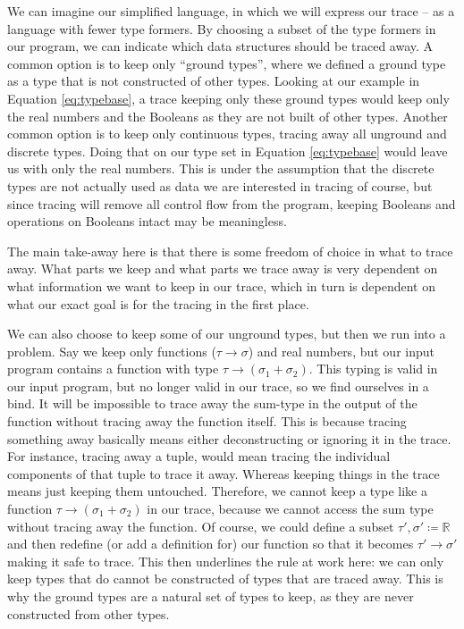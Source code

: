     We can imagine our simplified language, in which we will express our trace -- as a language with fewer type formers.
    By choosing a subset of the type formers in our program, we can indicate which data structures should be traced away.
    A common option is to keep only ``ground types'', where we defined a ground type as a type that is not constructed of other types.
    Looking at our example in Equation \ref{eq:typebase}, a trace keeping only these ground types would keep only the real numbers and the Booleans as they are not built of other types.
    Another common option is to keep only continuous types, tracing away all unground and discrete types.
    Doing that on our type set in Equation \ref{eq:typebase} would leave us with only the real numbers.
    This is under the assumption that the discrete types are not actually used as data we are interested in tracing of course, but since tracing will remove all control flow from the program, keeping Booleans and operations on Booleans intact may be meaningless. 

    The main take-away here is that there is some freedom of choice in what to trace away.
    What parts we keep and what parts we trace away is very dependent on what information we want to keep in our trace, which in turn is dependent on what our exact goal is for the tracing in the first place.
    
    We can also choose to keep some of our unground types, but then we run into a problem.
    Say we keep only functions ($\tau\to\sigma$) and real numbers, but our input program contains a function with type $\tau\to(\sigma_1+\sigma_2)$.
    This typing is valid in our input program, but no longer valid in our trace, so we find ourselves in a bind.
    It will be impossible to trace away the sum-type in the output of the function without tracing away the function itself.
    This is because tracing something away basically means either deconstructing or ignoring it in the trace.
    For instance, tracing away a tuple, would mean tracing the individual components of that tuple to trace it away.
    Whereas keeping things in the trace means just keeping them untouched.
    Therefore, we cannot keep a type like a function $\tau\to(\sigma_1+\sigma_2)$ in our trace, because we cannot access the sum type without tracing away the function.
    Of course, we could define a subset $\tau',\sigma'\coloneqq\mathbb{R}$ and then redefine (or add a definition for) our function so that it becomes $\tau'\to\sigma'$ making it safe to trace.
    This then underlines the rule at work here: we can only keep types that do cannot be constructed of types that are traced away.
    This is why the ground types are a natural set of types to keep, as they are never constructed from other types.
    
